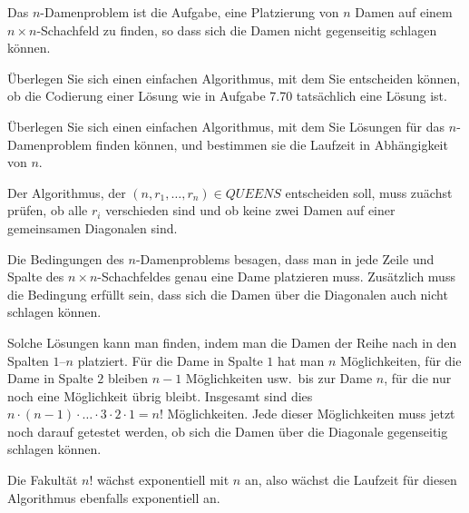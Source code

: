 Das $n$-Damenproblem ist die Aufgabe, eine Platzierung von $n$ Damen auf
einem $n\times n$-Schachfeld zu finden, so dass sich die Damen nicht
gegenseitig schlagen können.
\begin{teilaufgaben}
\item
Überlegen Sie sich einen einfachen Algorithmus, mit dem Sie entscheiden
können, ob die Codierung einer Lösung wie in Aufgabe 7.70 tatsächlich
eine Lösung ist.
\item
Überlegen Sie sich einen einfachen Algorithmus, mit dem Sie Lösungen
für das $n$-Damen\-problem finden können, und bestimmen sie die
Laufzeit in Abhängigkeit von $n$.
\end{teilaufgaben}


\begin{loesung}
\begin{teilaufgaben}
\item
Der Algorithmus, der $(n,r_1,\dots,r_n)\in\textit{QUEENS}$ entscheiden
soll, muss zuächst prüfen, ob alle $r_i$ verschieden sind und
ob keine zwei Damen auf einer gemeinsamen Diagonalen sind.
\item
Die Bedingungen des $n$-Damenproblems besagen, dass man in jede Zeile
und Spalte des $n\times n$-Schachfeldes genau eine Dame platzieren muss.
Zusätzlich muss die Bedingung erfüllt sein, dass sich die Damen über die
Diagonalen auch nicht schlagen können.

Solche Lösungen kann man finden, indem man die Damen 
der Reihe nach in den Spalten $1$--$n$ platziert.
Für die Dame in Spalte $1$ hat man $n$ Möglichkeiten, für die Dame
in Spalte $2$ bleiben $n-1$ Möglichkeiten usw.~bis zur Dame $n$, für
die nur noch eine Möglichkeit übrig bleibt.
Insgesamt sind dies $n\cdot (n-1)\cdot\ldots\cdot 3\cdot 2\cdot 1=n!$
Möglichkeiten.
Jede dieser Möglichkeiten muss jetzt noch darauf getestet werden,
ob sich die Damen über die Diagonale gegenseitig schlagen können.

Die Fakultät $n!$ wächst exponentiell mit $n$ an, also wächst die
Laufzeit für diesen Algorithmus ebenfalls exponentiell an.
\qedhere
\end{teilaufgaben}
\end{loesung}

